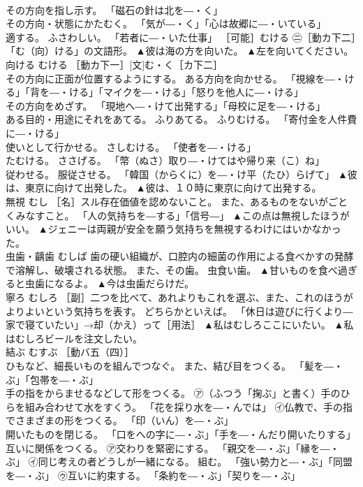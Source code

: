 \documentclass[8pt]{extreport}
\begin{document}
\begin{CJK}{UTF8}{min}
\\	その方向を指し示す。 「磁石の針は北を―・く」 
\\	その方向・状態にかたむく。 「気が―・く」「心は故郷に―・いている」 
\\	適する。 ふさわしい。 「若者に―・いた仕事」 ［可能］むける ㊁［動カ下二］「む（向）ける」の文語形。	▲彼は海の方を向いた。 ▲左を向いてください。
\\	向ける	むける	［動カ下一］[文]む・く［カ下二］ 
\\	その方向に正面が位置するようにする。 ある方向を向かせる。 「視線を―・ける」「背を―・ける」「マイクを―・ける」「怒りを他人に―・ける」 
\\	その方向をめざす。 「現地へ―・けて出発する」「母校に足を―・ける」 
\\	ある目的・用途にそれをあてる。 ふりあてる。 ふりむける。 「寄付金を人件費に―・ける」 
\\	使いとして行かせる。 さしむける。 「使者を―・ける」 
\\	たむける。 ささげる。 「幣（ぬさ）取り―・けてはや帰り来（こ）ね」 
\\	従わせる。 服従させる。 「韓国（からくに）を―・け平（たひ）らげて」	▲彼は、東京に向けて出発した。 ▲彼は、１０時に東京に向けて出発する。
\\	無視	むし	［名］スル存在価値を認めないこと。 また、あるものをないがごとくみなすこと。 「人の気持ちを―する」「信号―」	▲この点は無視したほうがいい。 ▲ジェニーは両親が安全を願う気持ちを無視するわけにはいかなかった。
\\	虫歯・齲歯	むしば	歯の硬い組織が、口腔内の細菌の作用による食べかすの発酵で溶解し、破壊される状態。 また、その歯。 虫食い歯。	▲甘いものを食べ過ぎると虫歯になるよ。 ▲今は虫歯だらけだ。
\\	寧ろ	むしろ	［副］二つを比べて、あれよりもこれを選ぶ、また、これのほうがよりよいという気持ちを表す。 どちらかといえば。 「休日は遊びに行くより―家で寝ていたい」→却（かえ）って［用法］	▲私はむしろここにいたい。 ▲私はむしろビールを注文したい。
\\	結ぶ	むすぶ	［動バ五（四）］ 
\\	ひもなど、細長いものを組んでつなぐ。 また、結び目をつくる。 「髪を―・ぶ」「包帯を―・ぶ」 
\\	手の指をからませるなどして形をつくる。 ㋐（ふつう「掬ぶ」と書く）手のひらを組み合わせて水をすくう。 「花を採り水を―・んでは」 ㋑仏教で、手の指でさまざまの形をつくる。 「印（いん）を―・ぶ」 
\\	開いたものを閉じる。 「口をへの字に―・ぶ」「手を―・んだり開いたりする」 
\\	互いに関係をつくる。 ㋐交わりを緊密にする。 「親交を―・ぶ」「縁を―・ぶ」 ㋑同じ考えの者どうしが一緒になる。 組む。 「強い勢力と―・ぶ」「同盟を―・ぶ」 ㋒互いに約束する。 「条約を―・ぶ」「契りを―・ぶ」 

\end{CJK}
\end{document}
